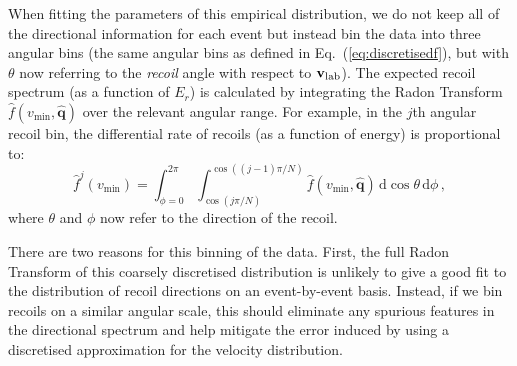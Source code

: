 When fitting the parameters of this empirical distribution, we do not keep all of the directional information for each event but instead bin the data into three angular bins (the same angular bins as defined in Eq.~(\ref{eq:discretisedf}), but with $\theta$ now referring to the \textit{recoil} angle with respect to $\mathbf{v}_{\rm lab}$). The expected recoil spectrum (as a function of $E_r$) is calculated by integrating the Radon Transform $\hat{f}(v_\mathrm{min}, \hat{\mathbf{q}})$ over the relevant angular range. For example, in the $j$th angular recoil bin, the differential rate of recoils (as a function of energy) is proportional to:
\begin{equation}
\label{eq:discreteRadon}
\hat{f}^j(v_\textrm{min}) = \int_{\phi = 0}^{2\pi} \int_{\cos(j\pi/N)}^{\cos((j-1)\pi/N)} \hat{f}(v_\textrm{min}, \hat{\textbf{q}})\, \mathrm{d}\cos\theta\,\mathrm{d}\phi\,,
\end{equation}
where $\theta$ and $\phi$ now refer to the direction of the recoil.

There are two reasons for this binning of the data. First, the full Radon Transform of this coarsely discretised distribution is unlikely to give a good fit to the distribution of recoil directions on an event-by-event basis. Instead, if we bin recoils on a similar angular scale, this should eliminate any spurious features in the directional spectrum and help mitigate the error induced by using a discretised approximation for the velocity distribution.

